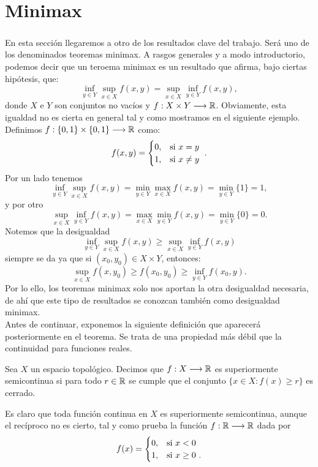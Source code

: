 \chapter{Minimax}
\newcommand{\topSpace}{X}
\newcommand{\topSpaceY}{Y}

\paragraph{}En esta sección llegaremos a otro de los resultados clave del trabajo. Será uno de los denominados teoremas minimax. A rasgos generales y a modo introductorio, podemos decir que un teroema minimax es un resultado que afirma, bajo ciertas hipótesis, que:
\[
\inf_{y \in Y} \sup_{x \in X} f(x,y) = \sup_{x \in X} \inf_{y \in Y} f(x,y),
\] 
donde $ X \text{ e } Y$ son conjuntos no vacíos y $ f: X \times Y \longrightarrow \mathbb{R} $. Obviamente, esta igualdad no es cierta en general tal y como mostramos en el siguiente ejemplo. Definimos $ f:\{0,1\} \times \{0,1\} \longrightarrow \mathbb{R}$ como:
\[
f(x,y) = \begin{cases}
0, & \mbox{si $ x=y $ } \\
1, & \mbox{si $ x\neq y$ }
\end{cases}.
\]
Por un lado tenemos
\[
\inf_{ y \in Y}\sup_{x \in X} f(x,y) = \min_{ y \in Y}\max_{x \in X} f(x,y) = \min_{ y \in Y}\{1\} = 1,
\]
y por otro
\[
\sup_{x \in X} \inf_{ y \in Y}f(x,y) = \max_{x \in X}\min_{ y \in Y}f(x,y) = \min_{ y \in Y}\{0\} = 0.
\]
Notemos que la desigualdad 
\[
\inf_{y \in Y} \sup_{x \in X} f(x,y) \geq \sup_{x \in X} \inf_{y \in Y} f(x,y)
\] 
siempre se da ya que si $ (x_0, y_0) \in X \times Y $, entonces:
\[
\sup_{x \in X} f(x,y_0) \geq f(x_0,y_0) \geq \inf_{y \in Y}f(x_0,y) .
\]
Por lo ello, los teoremas minimax solo nos aportan la otra desigualdad necesaria, de ahí que este tipo de resultados se conozcan también como desigualdad minimax. \\

Antes de continuar, exponemos la siguiente definición que aparecerá posteriormente en el teorema. Se trata de una propiedad más débil que la continuidad para funciones reales. 
\begin{definicion}
Sea $ \topSpace $ un espacio topológico. Decimos que $ f:\topSpace \longrightarrow \RR $ es superiormente semicontinua si para todo $ r \in \mathbb{R} $ se cumple que el conjunto $ \lbrace x \in \topSpace : f(x) \geq r \rbrace $ es cerrado.
\end{definicion}

Es claro que toda función continua en $ \topSpace $ es superiormente semicontinua, aunque el recíproco no es cierto, tal y como prueba la función $ f:\mathbb{R} \longrightarrow \mathbb{R} $ dada por 
\[
f(x) = \begin{cases}
0, & \mbox{si $ x < 0 $ } \\
1, & \mbox{si $x \geq 0$ }.
\end{cases}
\]

